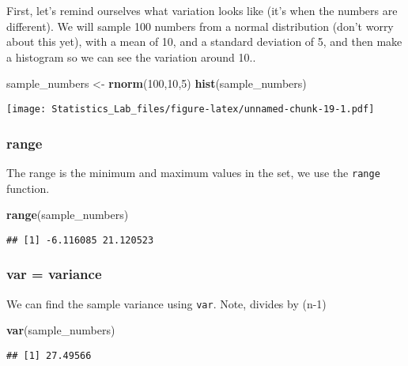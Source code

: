 \documentclass[
]{book}
\newenvironment{Shaded}{\begin{snugshade}}{\end{snugshade}}
\newcommand{\DecValTok}[1]{\textcolor[rgb]{0.00,0.00,0.81}{#1}}
\newcommand{\FunctionTok}[1]{\textcolor[rgb]{0.13,0.29,0.53}{\textbf{#1}}}
\newcommand{\NormalTok}[1]{#1}
\newcommand{\OtherTok}[1]{\textcolor[rgb]{0.56,0.35,0.01}{#1}}
\begin{document}
First, let's remind ourselves what variation looks like (it's when the numbers are different). We will sample 100 numbers from a normal distribution (don't worry about this yet), with a mean of 10, and a standard deviation of 5, and then make a histogram so we can see the variation around 10..

\begin{Shaded}
\begin{Highlighting}[]
\NormalTok{sample\_numbers }\OtherTok{\textless{}{-}} \FunctionTok{rnorm}\NormalTok{(}\DecValTok{100}\NormalTok{,}\DecValTok{10}\NormalTok{,}\DecValTok{5}\NormalTok{)}
\FunctionTok{hist}\NormalTok{(sample\_numbers)}
\end{Highlighting}
\end{Shaded}

\texttt{[image: Statistics\_Lab\_files/figure-latex/unnamed-chunk-19-1.pdf]}

\hypertarget{range}{%
\subsubsection{range}\label{range}}

The range is the minimum and maximum values in the set, we use the \texttt{range} function.

\begin{Shaded}
\begin{Highlighting}[]
\FunctionTok{range}\NormalTok{(sample\_numbers)}
\end{Highlighting}
\end{Shaded}

\begin{verbatim}
## [1] -6.116085 21.120523
\end{verbatim}

\hypertarget{var-variance}{%
\subsubsection{var = variance}\label{var-variance}}

We can find the sample variance using \texttt{var}. Note, divides by (n-1)

\begin{Shaded}
\begin{Highlighting}[]
\FunctionTok{var}\NormalTok{(sample\_numbers)}
\end{Highlighting}
\end{Shaded}

\begin{verbatim}
## [1] 27.49566
\end{verbatim}
\end{document}

